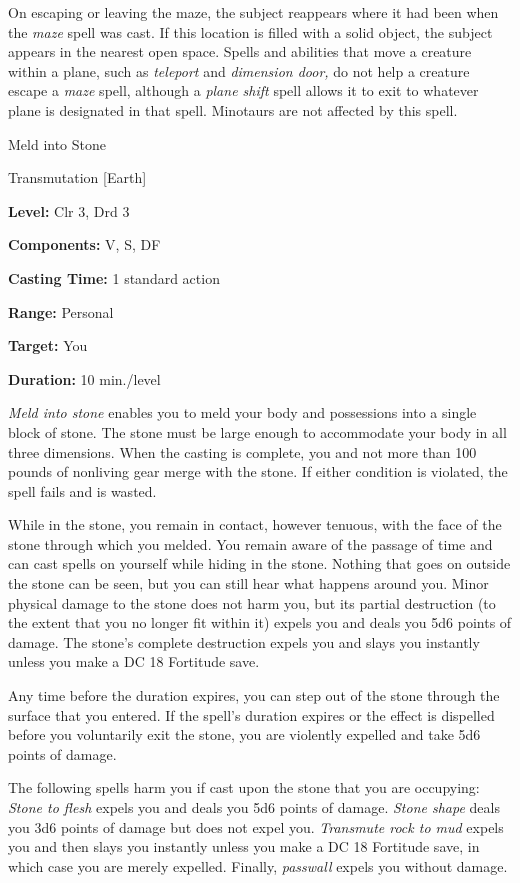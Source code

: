 \documentclass{article}
\begin{document}
On escaping or leaving the maze, the subject reappears where it had been when the 
\textit{maze }spell was cast. If this location is filled with a solid object, the 
subject appears in the nearest open space. Spells and abilities that move a creature 
within a plane, such as \textit{teleport }and \textit{dimension door, }do not help 
a creature escape a \textit{maze }spell, although a \textit{plane shift }spell 
allows it to exit to whatever plane is designated in that spell. Minotaurs are 
not affected by this spell.

\vspace{12pt}
Meld into Stone

Transmutation [Earth]

\textbf{Level:} Clr 3, Drd 3

\textbf{Components:} V, S, DF

\textbf{Casting Time:} 1 standard action

\textbf{Range:} Personal

\textbf{Target:} You

\textbf{Duration:} 10 min./level

\textit{Meld into stone }enables you to meld your body and possessions into a single 
block of stone. The stone must be large enough to accommodate your body in all 
three dimensions. When the casting is complete, you and not more than 100 pounds 
of nonliving gear merge with the stone. If either condition is violated, the spell 
fails and is wasted.

While in the stone, you remain in contact, however tenuous, with the face of the 
stone through which you melded. You remain aware of the passage of time and can 
cast spells on yourself while hiding in the stone. Nothing that goes on outside 
the stone can be seen, but you can still hear what happens around you. Minor physical 
damage to the stone does not harm you, but its partial destruction (to the extent 
that you no longer fit within it) expels you and deals you 5d6 points of damage. 
The stone's complete destruction expels you and slays you instantly unless you 
make a DC 18 Fortitude save.

Any time before the duration expires, you can step out of the stone through the 
surface that you entered. If the spell's duration expires or the effect is dispelled 
before you voluntarily exit the stone, you are violently expelled and take 5d6 
points of damage.

The following spells harm you if cast upon the stone that you are occupying: \textit{Stone 
to flesh }expels you and deals you 5d6 points of damage. \textit{Stone shape }deals 
you 3d6 points of damage but does not expel you. \textit{Transmute rock to mud 
}expels you and then slays you instantly unless you make a DC 18 Fortitude save, 
in which case you are merely expelled. Finally, \textit{passwall }expels you without 
damage.
\end{document}
